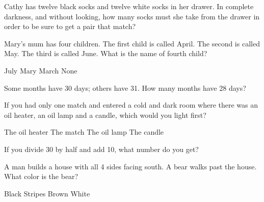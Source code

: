 \begin{questions}
\question Cathy has twelve black socks and twelve white socks in her drawer. In complete darkness, and without looking, how many socks must she take from the drawer in order to be sure to get a pair that match?
\begin{multicols}{4}
\begin{choices}  
\end{choices}
\end{multicols} 

\question Mary's mum has four children. The first child is called April. The second is called May. The third is called June. What is the name of fourth child?
\begin{multicols}{4}
\begin{choices}  
\choice July
\CorrectChoice Mary
\choice March
\choice None
\end{choices}
\end{multicols} 

\question Some months have 30 days; others have 31. How many months have 28 days?
\begin{multicols}{4}
\begin{choices} 
\end{choices}
\end{multicols} 

\question If you had only one match and entered a cold and dark room where there was an oil heater, an oil lamp and a candle, which would you light first?
\begin{multicols}{4}
\begin{choices}  
\choice The oil heater
\CorrectChoice The match
\choice The oil lamp 
\choice The candle
\end{choices}
\end{multicols} 

\question If you divide 30 by half and add 10, what number do you get?
\begin{multicols}{4}
\begin{choices}  
\end{choices}
\end{multicols} 

\question A man builds a house with all 4 sides facing south. A bear walks past the house. What color is the bear?
\begin{multicols}{4}
\begin{choices}  
\choice Black 
\choice Stripes 
\choice Brown  
\CorrectChoice White
\end{choices}
\end{multicols} 


\end{questions}
